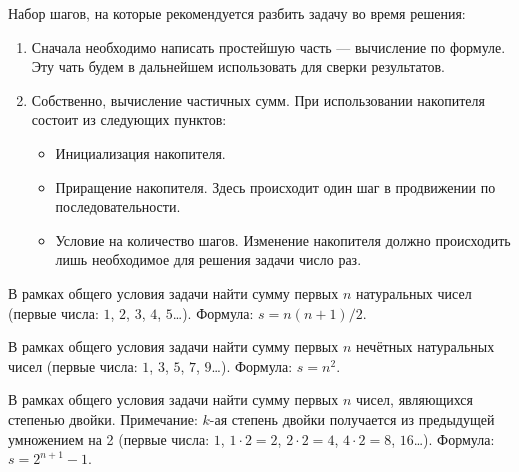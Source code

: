 \zzsectionPLAN

Набор шагов, на которые рекомендуется разбить задачу во время решения:
\begin{enumerate}
\item Сначала необходимо написать простейшую часть --- вычисление по формуле. Эту чать будем в дальнейшем использовать для сверки результатов.
%
\item Собственно, вычисление частичных сумм. При использовании накопителя состоит из следующих пунктов:
\begin{itemize}
	\item Инициализация накопителя.
	\item Приращение накопителя. Здесь происходит один шаг в продвижении по последовательности.
	\item Условие на количество шагов. Изменение накопителя должно происходить лишь необходимое для решения задачи число раз.
\end{itemize}
\end{enumerate}


\zzsectionVARIATIONS


\begin{zztask}
В рамках общего условия задачи найти сумму первых $n$ натуральных чисел
(первые числа: $1$, $2$, $3$, $4$, $5$\dots).
Формула: $s = n(n+1)/2$.
\end{zztask}


\begin{zztask}
В рамках общего условия задачи найти сумму первых $n$ нечётных натуральных 
чисел (первые числа: $1$, $3$, $5$, $7$, $9$\dots).
Формула: $s = n^2$.
\end{zztask}


\begin{zztask}
В рамках общего условия задачи найти сумму первых $n$ чисел, являющихся
степенью двойки. Примечание: $k$-ая степень двойки получается из предыдущей
умножением на 2 (первые числа: $1$, $1\cdot2=2$, $2\cdot2=4$, $4\cdot2=8$, 
$16$\dots).
Формула: $s = 2^{n+1}-1$.
\end{zztask}


